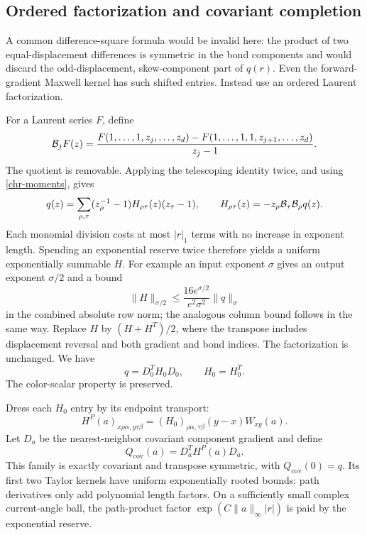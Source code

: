 \documentclass[11pt]{article}
\theoremstyle{remark}
\begin{document}
\subsection{Ordered factorization and covariant completion}
\label{chr-factorization}

A common difference-square formula would be invalid here: the
product of two equal-displacement differences is symmetric in
the bond components and would discard the odd-displacement,
skew-component part of \(q(r)\).  Even the forward-gradient Maxwell
kernel has such shifted entries.  Instead use an ordered Laurent
factorization.

For a Laurent series \(F\), define
\[
 {\cal B}_jF(z)=
 \frac{F(1,\ldots,1,z_j,\ldots,z_d)
       -F(1,\ldots,1,1,z_{j+1},\ldots,z_d)}{z_j-1}.
\]
The quotient is removable.  Applying the telescoping identity
twice, and using \eqref{chr-moments}, gives
\begin{equation}
 q(z)=\sum_{\rho,\tau}(z_\rho^{-1}-1)
       H_{\rho\tau}(z)(z_\tau-1),\qquad
 H_{\rho\tau}(z)=-z_\rho{\cal B}_\tau{\cal B}_\rho q(z).
 \label{chr-laurent}
\end{equation}
Each monomial division costs at most \(|r|_1\) terms with no
increase in exponent length.  Spending an exponential reserve
twice therefore yields a uniform exponentially summable \(H\).
For example an input exponent \(\sigma\) gives an output
exponent \(\sigma/2\) and a bound
\[
 \|H\|_{\sigma/2}
 \leq \frac{16e^{\sigma/2}}{e^2\sigma^2}\|q\|_\sigma
\]
in the combined absolute row norm; the analogous column bound
follows in the same way.  Replace \(H\) by \((H+H^T)/2\), where
the transpose includes displacement reversal and both gradient
and bond indices.  The factorization is unchanged.  We have
\begin{equation}
                  q=D_0^TH_0D_0,\qquad H_0=H_0^T.
 \label{chr-flat-factor}
\end{equation}
The color-scalar property is preserved.

Dress each \(H_0\) entry by its endpoint transport:
\[
 H^P(a)_{x\rho\alpha,y\tau\beta}
       =(H_0)_{\rho\alpha,\tau\beta}(y-x)W_{xy}(a).
\]
Let \(D_a\) be the nearest-neighbor covariant component gradient
and define
\begin{equation}
                  Q_{\mathrm{cov}}(a)
                   =D_a^TH^P(a)D_a .
 \label{chr-completion}
\end{equation}
This family is exactly covariant and transpose symmetric, with
\(Q_{\mathrm{cov}}(0)=q\).  Its first two Taylor kernels have
uniform exponentially rooted bounds: path derivatives only add
polynomial length factors.  On a sufficiently small complex
current-angle ball, the path-product factor
\(\exp(C\|a\|_\infty|r|)\) is paid by the exponential reserve.
\end{document}
